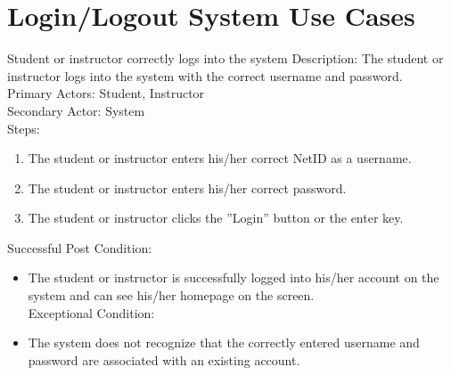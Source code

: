 
\chapter{Login/Logout System Use Cases}
    \begin{section}{Student or instructor correctly logs into the system}
        Description: The student or instructor logs into the system with the correct username and password.\\
        Primary Actors: Student, Instructor\\
        Secondary Actor: System\\
        Steps:
        \begin{enumerate}
            \item The student or instructor enters his/her correct NetID as a username.
            \item The student or instructor enters his/her correct password.
            \item The student or instructor clicks the ''Login'' button or the enter key.
        \end{enumerate}
        Successful Post Condition:\\
        \begin{itemize}
        \item The student or instructor is successfully logged into his/her account on the system and can see his/her homepage on the screen.\\
        Exceptional Condition:
        \item The system does not recognize that the correctly entered username and password are associated with an existing account.
        \end{itemize}
        \end{section}
